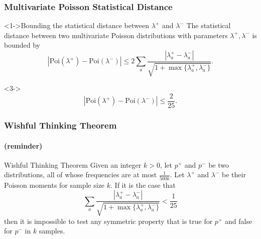\documentclass{beamer}
\begin{document}
\begin{frame}
  \frametitle{Multivariate Poisson Statistical Distance}
    \begin{block}<1->{Bounding the statistical distance between $\lambda^+$ and $\lambda^-$}
      The statistical distance between two multivariate Poisson
      distributions with parameters $\lambda^+, \lambda^-$ is bounded
      by
      \begin{equation*}
        |\mbox{Poi}(\lambda^+)-\mbox{Poi}(\lambda^-)|\le 2\sum_a\frac{|\lambda^+_a-\lambda^-_a|}{\sqrt{1+\max\{\lambda^+_a,\lambda_a^-\}}}.
      \end{equation*}
    \end{block}
    \begin{block}<3->{}
      \begin{equation*}
        |\mbox{Poi}(\lambda^+)-\mbox{Poi}(\lambda^-)|\le \frac{2}{25}.
      \end{equation*}
    \end{block}
\end{frame}

\begin{frame}
  \frametitle{Wishful Thinking Theorem} \framesubtitle{(reminder)}

  \begin{block}{Wishful Thinking Theorem}
    Given an integer $k>0$, let $p^+$ and $p^-$ be two distributions,
    all of whose frequencies are at most $\frac{1}{500k}$. Let
    $\lambda^+$ and $\lambda^-$ be their Poisson moments for sample
    size $k$. If it is the case that
    \begin{equation*}
      \sum_a\frac{|\lambda^+_a-\lambda^-_a|}{\sqrt{1+\max\{\lambda^+_a,\lambda^-_a\}}}<\frac{1}{25}
    \end{equation*}
    then it is impossible to test any symmetric property that is true
    for $p^+$ and false for $p^-$ in $k$ samples.
  \end{block}

\end{frame}
\end{document}
